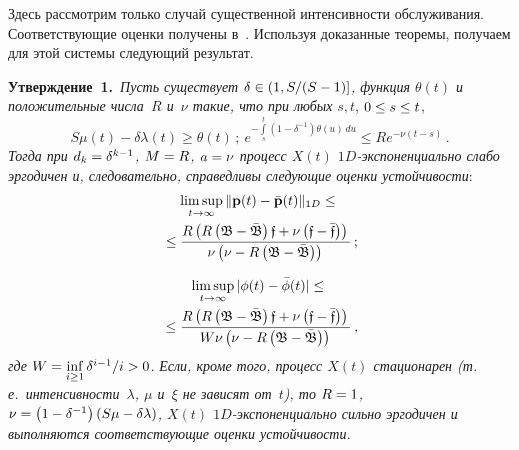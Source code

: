 \begin{multicols}{2}
\medskip

Здесь рассмотрим только случай существенной интенсивности обслуживания.
Соответствующие оценки получены в~\cite{z12}.
Используя доказанные теоремы, получаем для этой системы следующий результат.

\medskip

\noindent
\textbf{Утверждение~1.}\
\textit{Пусть существует  $\delta \hm\in \left(1,{S}/(S-1)\right]$, функция $\theta(t)$
и положительные чис\-ла~$R$ и~$\nu$
такие, что при любых}  $s,t$, $0 \hm\le s \hm\le t$,
\begin{equation*}
S\mu(t)-\delta\lambda(t) \ge \theta(t)\,; \ 
e^{-\int\limits_s^t\left(1-\delta^{-1}\right)\theta(u)\, du} \le R e^{-\nu (t-s)}\,.
\end{equation*}
\textit{Тогда при  $d_k\hm=\delta^{k-1}$, $M\hm=R$, $a\hm =\nu$
процесс $X(t)$ $1D$-экс\-по\-нен\-ци\-аль\-но слабо эргодичен и,
следовательно, справедливы следующие оценки устойчивости}:
\begin{multline}
\limsup\limits_{t \to \infty}   \|{\bf p}(t)- {\bar{\bf p}}(t)\|_{1D} \le{}\\
{}\le
\displaystyle\frac{\displaystyle R\left(R\left(\mathfrak{B-\bar{B}}\right) \mathfrak{f}  + \nu\left(\mathfrak{f-\bar{f}}\right)\right)\mathstrut}{\displaystyle \nu\left(\nu - R\left(\mathfrak{B-\bar{B}}\right)\right)\mathstrut}\,;
\label{4014}
\end{multline}

\vspace*{-12pt}

\begin{multline}
\limsup\limits_{t \to \infty}  |\phi(t) - \bar{\phi}(t)|\le{}\\
{}\le
\displaystyle\frac{\displaystyle R\left(R\left(\mathfrak{B-\bar{B}}\right) \mathfrak{f}  +
 \nu\left(\mathfrak{f-\bar{f}}\right)\right)\mathstrut}{\displaystyle W\nu\left(\nu - R\left(\mathfrak{B-\bar{B}}\right)\right)\mathstrut}\,,
\label{4015}
\end{multline}
\textit{где} $W=\inf\limits_{i \ge 1}  {\delta^{i-1}}/{i} \hm> 0$.
\textit{Если, кроме того, процесс $X(t)$ стационарен (т.\,е.\ интенсивности~$\lambda$,
$\mu$ и~$\xi$ не зависят от~$t$), то $R\hm=1$, $\nu \hm=
\left(1\hm-\delta^{-1}\right)\left(S\mu\hm-\delta\lambda\right)$,
$X(t)$  $1D$-экс\-по\-нен\-ци\-аль\-но
сильно эргодичен и выполняются соответствующие оценки устойчивости.}


\medskip


\end{multicols}
